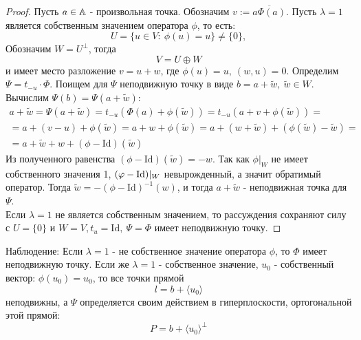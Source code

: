 \begin{proof}
    Пусть $a\in \A$ - произвольная точка. Обозначим $v:=\overline{a\Phi(a)}$. Пусть $\lambda=1$ является собственным значением оператора $\phi$, то есть:
    \[U=\{u\in V:\ \phi(u)=u\}\ne \{0\},\]
    Обозначим $W=U^{\perp}$, тогда
    \[V=U\oplus W\]
    и имеет место разложение $v=u+w$, где $\phi(u)=u,\ (w,u)=0$. Определим $\Psi=t_{-u}\cdot \Phi$. Поищем для $\Psi$ неподвижную точку в виде $b=a+\widetilde{w},\ \widetilde{w}\in W$. Вычислим $\Psi(b) = \Psi(a+\widetilde{w})$:
    \begin{multline*}
        a+\widetilde{w} = \Psi(a+\widetilde{w})=t_{-u}(\Phi(a)+\phi(\widetilde{w}))=t_{-u}(a+v+\phi(\widetilde{w}))=\\
        =a+(v-u)+\phi(\widetilde{w})=a+w+\phi(\widetilde{w})=a+(w+\widetilde{w})+(\phi(\widetilde{w})-\widetilde{w})=\\
        =a+\widetilde{w}+w+(\phi-\text{Id})(\widetilde{w})
    \end{multline*}
    Из полученного равенства $(\phi-\text{Id})(\widetilde{w}) = -w$. Так как $\phi|_W$ не имеет собственного значения 1, $(\phi - \textup{Id})|_W$ невырожденный, а значит обратимый оператор. Тогда $\widetilde{w} = -(\phi-\text{Id})^{-1}(w)$, и тогда $a + \widetilde{w}$ - неподвижная точка для $\Psi$.\\
    Если $\lambda=1$ не является собственным значением, то рассуждения сохраняют силу с $U=\{0\}$ и $W=V, t_u=\text{Id},\ \Psi=\Phi$ имеет неподвижную точку.
\end{proof}
Наблюдение: Если $\lambda=1$ - не собственное значение оператора $\phi$, то $\Phi$ имеет неподвижную точку. Если же $\lambda =1$ - собственное значение, $u_0$ - собственный вектор: $\phi(u_0)=u_0$, то все точки прямой
\[l=b+\langle u_0 \rangle\] 
неподвижны, а $\Psi$ определяется своим действием в гиперплоскости, ортогональной этой прямой:
\[P=b+\langle u_0 \rangle^{\perp}\]
